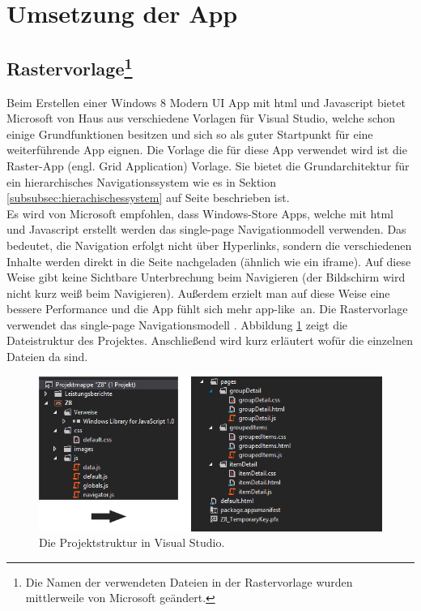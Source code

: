 \documentclass[12pt,a4paper,bibtotoc,abstracton]{scrartcl}
\begin{document}
\newpage
\section{Umsetzung der App}
\label{sec:umsetzungderapp}

\subsection[Rastervorlage] {Rastervorlage\footnote{Die Namen der verwendeten Dateien in der Rastervorlage wurden mittlerweile von Microsoft geändert.}}
\label{subsec:rastervorlage}
Beim Erstellen einer Windows 8 Modern UI App mit \ac{html} und Javascript bietet Microsoft von Haus aus verschiedene Vorlagen für Visual Studio, welche schon einige Grundfunktionen besitzen und sich so als guter Startpunkt für eine weiterführende App eignen. Die Vorlage die für diese App verwendet wird ist die Raster-App (engl. Grid Application) Vorlage. Sie bietet die Grundarchitektur für ein hierarchisches Navigationssystem wie es in Sektion \ref{subsubsec:hierachischessystem} auf Seite \pageref{subsubsec:hierachischessystem} beschrieben ist.\\
Es wird von Microsoft empfohlen, dass Windows-Store Apps, welche mit \ac{html} und Javascript erstellt werden das single-page Navigationmodell verwenden. Das bedeutet, die Navigation erfolgt nicht über Hyperlinks, sondern die verschiedenen Inhalte werden direkt in die Seite nachgeladen (ähnlich wie ein iframe). Auf diese Weise gibt keine Sichtbare Unterbrechung beim Navigieren (der Bildschirm wird nicht kurz weiß beim Navigieren). Außerdem erzielt man auf diese Weise eine bessere Performance und die App fühlt sich mehr \glqq app-like\grqq\ an. Die Rastervorlage verwendet das single-page Navigationsmodell \citep{MicrosoftSinglePage2013}. Abbildung \ref{fig:projektmappe} zeigt die Dateistruktur des Projektes. Anschließend wird kurz erläutert wofür die einzelnen Dateien da sind.

\begin{figure}[h]
	\centering
	\includegraphics[width=\textwidth]{Bilder/Screenshots/app/projektmappe.png} 
	\caption{Die Projektstruktur in Visual Studio.}
	\label{fig:projektmappe}
\end{figure}
\end{document}
